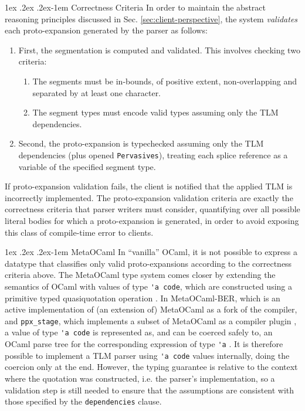 \documentclass[acmsmall]{acmart}
\makeatletter
\renewcommand{\subsubsection}{%
  \@startsection{subsubsection}{3}%
  {\z@}{1ex \@plus .2ex \@minus .2ex}{-1em}%
  {\normalfont\normalsize\bfseries}%
}
\newcommand{\li}[1]{\lstinline[basicstyle=\ttfamily\fontsize{9pt}{1em}\selectfont]{#1}}
\makeatother
\begin{document}
\subsubsection{Correctness Criteria}
\label{sec:correctness-criteria}
In order to maintain the abstract reasoning principles discussed in Sec. \ref{sec:client-perspective}, the system \emph{validates} each proto-expansion generated by the parser as follows:
\begin{enumerate}
  \item First, the segmentation is computed and validated. This involves checking two criteria:
    \begin{enumerate}
      \item The segments must be in-bounds, of positive extent, non-overlapping and separated by at least one character.
      \item The segment types must encode valid types assuming only the TLM dependencies.
    \end{enumerate}
  \item Second, the proto-expansion is typechecked assuming only the TLM dependencies (plus opened \li{Pervasives}), treating each splice reference as a variable of the specified segment type.
\end{enumerate}
If proto-expansion validation fails, the client is notified that the applied TLM is incorrectly implemented. The proto-expansion validation criteria are exactly the correctness criteria that parser writers must consider, quantifying over all possible literal bodies for which a proto-expansion is generated, in order to avoid exposing this class of compile-time error to clients.

\subsubsection{MetaOCaml}\label{sec:metaocaml} In ``vanilla'' OCaml, it is not possible to express a datatype that classifies only valid proto-expansions according to the correctness criteria above. The MetaOCaml type system comes closer by extending the semantics of OCaml with values of type \li{'a code}, which are constructed using a primitive typed quasiquotation operation \cite{DBLP:conf/flops/Kiselyov14,taha2004gentle}. In MetaOCaml-BER, which is an active implementation of (an extension of) MetaOCaml as a fork of the compiler, and \li{ppx_stage}, which implements a subset of MetaOCaml as a compiler plugin \cite{ppxstage}, a value of type \li{'a code} is represented as, and can be coerced safely to, an OCaml parse tree for the corresponding expression of type \li{'a} \cite{DBLP:conf/flops/Kiselyov14}. It is therefore possible to implement a TLM parser using \li{'a code} values internally, doing the coercion only at the end. However, the typing guarantee is relative to the context where the quotation was constructed, i.e. the parser's implementation, so a validation step is still needed to ensure that the assumptions are consistent with those specified by the \li{dependencies} clause. 
\end{document}
